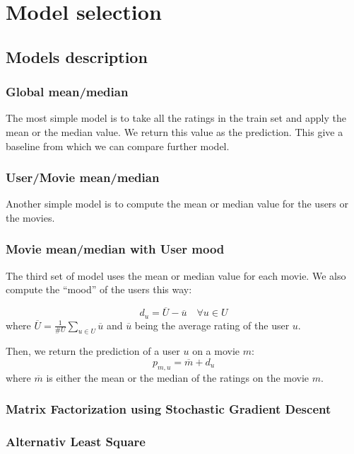 \documentclass[10pt,conference,compsocconf]{IEEEtran}
\begin{document}
\section{Model selection}

\subsection{Models description}
\subsubsection{Global mean/median}

The most simple model is to take all the ratings in the train set and apply the mean or the median value. We return this value as the prediction. This give a baseline from which we can compare further model.

\subsubsection{User/Movie mean/median}

Another simple model is to compute the mean or median value for the users or the movies.

\subsubsection{Movie mean/median with User mood}

The third set of model uses the mean or median value for each movie. We also compute the ``mood'' of the users this way:

\begin{equation}
 d_u = \overline{U} - \overline{u} \quad \forall u\in U
\end{equation}
where $\overline{U} = \frac{1}{\#U} \sum_{u\in U} \overline{u}$ and $\overline{u}$ being the average rating of the user $u$.

Then, we return the prediction of a user $u$ on a movie $m$:
\begin{equation}
 p_{m,u} = \overline{m} + d_u
\end{equation}
where $\overline{m}$ is either the mean or the median of the ratings on the movie $m$.

\subsubsection{Matrix Factorization using Stochastic Gradient Descent}
\subsubsection{Alternativ Least Square}
\end{document}
